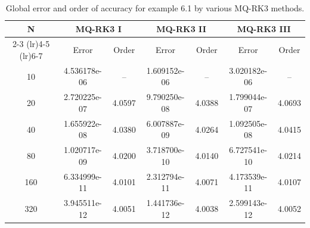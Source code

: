 \documentclass[a4paper, preprint,11pt]{elsarticle}
\numberwithin{equation}{section}
\begin{document}
\begin{table}[htbp!]
    \centering
     \caption{Global error and order of accuracy for example 6.1 by various MQ-RK3 methods.}
    \begin{tabular}{c c c c c c c}
        \toprule
        N & \multicolumn{2}{c}{MQ-RK3 I}  & \multicolumn{2}{c}{MQ-RK3 II} & \multicolumn{2}{c}{MQ-RK3 III} \\
        \cmidrule(lr){2-3} \cmidrule(lr){4-5}  \cmidrule(lr){6-7}
          & Error & Order & Error & Order & Error & Order \\
        \midrule
        10  &  4.536178e-06    & -- & 1.609152e-06  & -- & 3.020182e-06       & --    \\
        20  & 2.720225e-07    & 4.0597 &  9.790250e-08  &  4.0388 & 1.799044e-07 &  4.0693 \\
        40  & 1.655922e-08   &   4.0380&  6.007887e-09  & 4.0264 & 1.092505e-08     &  4.0415 \\
        80  &1.020717e-09    &   4.0200 &  3.718700e-10 & 4.0140 &  6.727541e-10   &   4.0214 \\
        160 &  6.334999e-11  &   4.0101& 2.312794e-11  &  4.0071 &  4.173539e-11       & 4.0107\\
        320 & 3.945511e-12 & 4.0051 &1.441736e-12  &    4.0038 &  2.599143e-12  &  4.0052\\
        \bottomrule
    \end{tabular}
\end{table}
\end{document}
